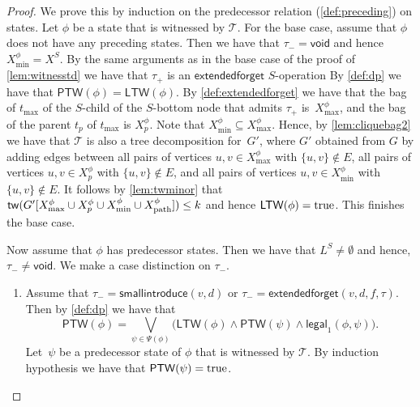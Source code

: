 \documentclass[a4paper,UKenglish,cleveref, autoref, thm-restate, numberwithinsect]{lipics-v2021}
\newcommand{\tw}{\mathsf{tw}}
\newcommand{\smallintroduce}{\mathsf{smallintroduce}}
\newcommand{\extendedforget}{\mathsf{extendedforget}}
\newcommand{\void}{\mathsf{void}}
\newcommand{\ptw}{\mathsf{PTW}}
\newcommand{\ltw}{\mathsf{LTW}}
\newcommand{\legal}{\mathsf{legal}}
\newcommand{\dpath}{\textup{path}}
\newcommand{\true}{\textup{true}}
\begin{document}
\begin{proof}
We prove this by induction on the predecessor relation (\cref{def:preceding}) on states. Let $\phi$ be a state that is witnessed by $\mathcal{T}$. For the base case, assume that $\phi$ does not have any preceding states. Then we have that $\tau_-=\void$ and hence $X^\phi_{\min}=X^S$. By the same arguments as in the base case of the proof of \cref{lem:witnesstd} we have that $\tau_+$ is an $\extendedforget$ $S$-operation
By \cref{def:dp} we have that $\ptw(\phi)=\ltw(\phi)$.
By \cref{def:extendedforget} we have that the bag of $t_{\max}$ of the $S$-child of the $S$-bottom node that admits $\tau_+$ is~$X^{\phi}_{\max}$, and the bag of the parent $t_p$ of $t_{\max}$ is $X^{\phi}_p$. 
Note that $X^{\phi}_{\min}\subseteq X^{\phi}_{\max}$. Hence, by \cref{lem:cliquebag2} we have that $\mathcal{T}$ is also a tree decomposition for~$G'$, where $G'$ obtained from $G$ by adding edges between all pairs of vertices $u,v\in X^{\phi}_{\max}$ with $\{u,v\}\notin E$,  all pairs of vertices $u,v\in  X^{\phi}_p$ with $\{u,v\}\notin E$, and all pairs of vertices $u,v\in X^{\phi}_{\min}$ with $\{u,v\}\notin E$. It follows by \cref{lem:twminor} that $\tw(G'[X^{\phi}_{\max}\cup X^{\phi}_p\cup X^{\phi}_{\min}\cup X^{\phi}_{\dpath}])\le k$ and hence $\ltw(\phi)=\true$. This finishes the base case.



Now assume that $\phi$ has predecessor states. Then we have that $L^S\neq \emptyset$ and hence, $\tau_-\neq\void$. We make a case distinction on $\tau_-$.
\begin{enumerate}
\item Assume that $\tau_-=\smallintroduce(v,d)$ or $\tau_-=\extendedforget(v,d,f,\tau)$. 
Then by \cref{def:dp} we have that 
        \[
        \ptw(\phi) = \bigvee_{\psi\in\Psi(\phi)} \bigl(\ltw(\phi)\wedge\ptw(\psi)\wedge\legal_1(\phi,\psi)\bigr).
        \]
Let~$\psi$ be a predecessor state of ${\phi}$ that is witnessed by $\mathcal{T}$. By induction hypothesis we have that $\ptw(\psi)=\true$. 



\end{enumerate}
\end{proof}
\end{document}
